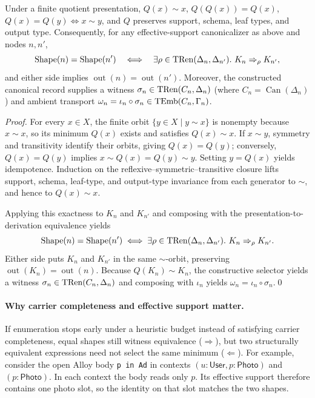 \begin{theorem}
\label{thm:shape-exactness}
Under a finite quotient presentation, $Q(x)\sim x$, $Q(Q(x))=Q(x)$,
$Q(x)=Q(y)\iff x\sim y$, and $Q$ preserves support, schema, leaf types, and
output type. Consequently, for any effective-support canonicalizer as above and
nodes $n,n'$,
\[
 \operatorname{Shape}(n)=\operatorname{Shape}(n')
 \quad\Longleftrightarrow\quad
 \exists\rho\in\operatorname{TRen}(\Delta_n,\Delta_{n'}).\ K_n\Rightarrow_\rho K_{n'},
\]
and either side implies $\operatorname{out}(n)=\operatorname{out}(n')$.
Moreover, the constructed canonical record supplies a witness
$\sigma_n\in\operatorname{TRen}(C_n,\Delta_n)$ (where $C_n=\operatorname{Can}(\Delta_n)$)
and ambient transport $\omega_n=\iota_n\circ\sigma_n\in\operatorname{TEmb}(C_n,\Gamma_n)$.
\end{theorem}
\begin{proof}
For every $x\in X$, the finite orbit $\{y\in X\mid y\sim x\}$ is nonempty because
$x\sim x$, so its minimum $Q(x)$ exists and satisfies $Q(x)\sim x$. If $x\sim y$,
symmetry and transitivity identify their orbits, giving $Q(x)=Q(y)$;
conversely, $Q(x)=Q(y)$ implies $x\sim Q(x)=Q(y)\sim y$. Setting $y=Q(x)$ yields
idempotence. Induction on the reflexive--symmetric--transitive closure lifts
support, schema, leaf-type, and output-type invariance from each generator to
$\sim$, and hence to $Q(x)\sim x$.

Applying this exactness to $K_n$ and $K_{n'}$ and composing with the
presentation-to-derivation equivalence yields
\[
 \operatorname{Shape}(n)=\operatorname{Shape}(n')
 \iff
 \exists\rho\in\operatorname{TRen}(\Delta_n,\Delta_{n'}).\ K_n\Rightarrow_\rho K_{n'}.
\]
Either side puts $K_n$ and $K_{n'}$ in the same $\sim$-orbit, preserving
$\operatorname{out}(K_n)=\operatorname{out}(n)$. Because $Q(K_n)\sim K_n$, the
constructive selector yields a witness $\sigma_n\in\operatorname{TRen}(C_n,\Delta_n)$ and
composing with $\iota_n$ yields $\omega_n=\iota_n\circ\sigma_n$.\qed
\end{proof}

\paragraph{Why carrier completeness and effective support matter.}
If enumeration stops early under a heuristic budget instead of satisfying
carrier completeness, equal shapes still witness equivalence ($\Rightarrow$),
but two structurally equivalent expressions need not select the same minimum
($\Leftarrow$). For example, consider the open Alloy body \texttt{p in Ad} in contexts
$(u\!:\!\mathsf{User},p\!:\!\mathsf{Photo})$ and $(p\!:\!\mathsf{Photo})$.
In each context the body reads only $p$. Its effective support therefore
contains one photo slot, so the identity on that slot matches the two shapes.

